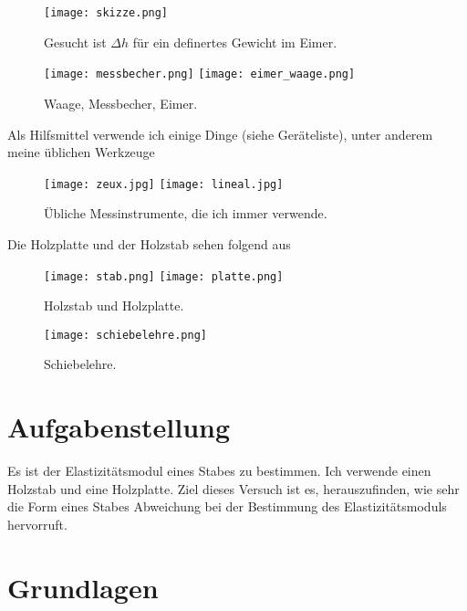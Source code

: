 \documentclass{article}
\begin{document}
\begin{figure}[H]
\texttt{[image: skizze.png]}
\caption{Gesucht ist $\Delta h$ für ein definertes Gewicht im Eimer.}
\end{figure}


\begin{figure}[H]
\texttt{[image: messbecher.png]}
\texttt{[image: eimer\_waage.png]}
\caption{Waage, Messbecher, Eimer.}
\end{figure}




Als Hilfsmittel verwende ich einige Dinge (siehe Geräteliste), unter anderem meine üblichen Werkzeuge
\begin{figure}[H]
\texttt{[image: zeux.jpg]}
\texttt{[image: lineal.jpg]}
\caption{Übliche Messinstrumente, die ich immer verwende.}
\end{figure}

Die Holzplatte und der Holzstab sehen folgend aus
\begin{figure}[H]
\texttt{[image: stab.png]}
\texttt{[image: platte.png]}
\caption{Holzstab und Holzplatte.}
\end{figure}


\begin{figure}[H]
\texttt{[image: schiebelehre.png]}
\caption{Schiebelehre.}
\end{figure}



\newpage

\section{Aufgabenstellung}

Es ist der Elastizitätsmodul eines Stabes zu bestimmen. Ich verwende einen Holzstab und eine Holzplatte. Ziel dieses Versuch ist es, herauszufinden, wie sehr die Form eines Stabes Abweichung bei der Bestimmung des Elastizitätsmoduls hervorruft.


\section{Grundlagen}
\end{document}
